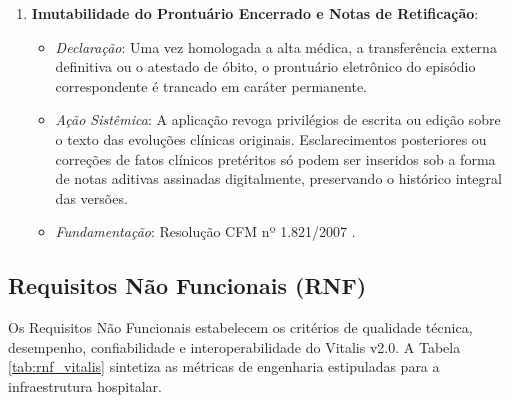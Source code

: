 \begin{enumerate}[label=\textbf{RN-\arabic*:}, leftmargin=*]
    \item \textbf{Imutabilidade do Prontuário Encerrado e Notas de Retificação}:
    \begin{itemize}[noitemsep]
        \item \textit{Declaração}: Uma vez homologada a alta médica, a transferência externa definitiva ou o atestado de óbito, o prontuário eletrônico do episódio correspondente é trancado em caráter permanente.
        \item \textit{Ação Sistêmica}: A aplicação revoga privilégios de escrita ou edição sobre o texto das evoluções clínicas originais. Esclarecimentos posteriores ou correções de fatos clínicos pretéritos só podem ser inseridos sob a forma de notas aditivas assinadas digitalmente, preservando o histórico integral das versões.
        \item \textit{Fundamentação}: Resolução CFM nº 1.821/2007 \cite{cfm_prontuario:2007}.
    \end{itemize}
\end{enumerate}

\subsection{Requisitos Não Funcionais (RNF)}

Os Requisitos Não Funcionais estabelecem os critérios de qualidade técnica, desempenho, confiabilidade e interoperabilidade do Vitalis v2.0. A Tabela \ref{tab:rnf_vitalis} sintetiza as métricas de engenharia estipuladas para a infraestrutura hospitalar.

